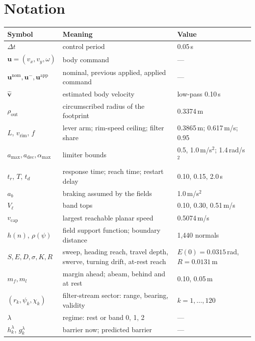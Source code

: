 \documentclass[11pt]{article}
\theoremstyle{definition}
\begin{document}



\appendix
\section{Notation}\label{app:notation}

\begin{table}[h]
\centering
\small
\begin{tabularx}{\textwidth}{lXl}
\toprule
Symbol & Meaning & Value\\
\midrule
$\Delta t$ & control period & 0.05\,s\\
$\mathbf{u}=(v_x,v_y,\omega)$ & body command & ---\\
$\mathbf{u}^{\mathrm{nom}},\mathbf{u}^-,\mathbf{u}^{\mathrm{app}}$ & nominal, previous applied, applied command & ---\\
$\hat{\mathbf{v}}$ & estimated body velocity & low-pass 0.10\,s\\
$\rho_{\mathrm{out}}$ & circumscribed radius of the footprint & 0.3374\,m\\
$L$, $v_{\mathrm{rim}}$, $f$ & lever arm; rim-speed ceiling; filter share & 0.3865\,m; 0.617\,m/s; 0.95\\
$a_{\max},a_{\mathrm{dec}},\alpha_{\max}$ & limiter bounds & 0.5, 1.0\,m/s$^2$; 1.4\,rad/s$^2$\\
$t_r$, $T$, $t_d$ & response time; reach time; restart delay & 0.10, 0.15, 2.0\,s\\
$a_b$ & braking assumed by the fields & 1.0\,m/s$^2$\\
$V_\ell$ & band tops & 0.10, 0.30, 0.51\,m/s\\
$v_{\mathrm{cap}}$ & largest reachable planar speed & 0.5074\,m/s\\
$h(n)$, $\rho(\psi)$ & field support function; boundary distance & 1{,}440 normals\\
$S,E,D,\sigma,K,R$ & sweep, heading reach, travel depth, swerve, turning drift, at-rest reach & $E(0)=0.0315$\,rad, $R=0.0131$\,m\\
$m_f,m_l$ & margin ahead; abeam, behind and at rest & 0.10, 0.05\,m\\
$(r_k,\psi_k,\chi_k)$ & filter-stream sector: range, bearing, validity & $k=1,\dots,120$\\
$\lambda$ & regime: rest or band 0, 1, 2 & ---\\
$h^\lambda_k$, $g^\lambda_k$ & barrier now; predicted barrier & ---\\

\end{tabularx}
\end{table}
\end{document}
